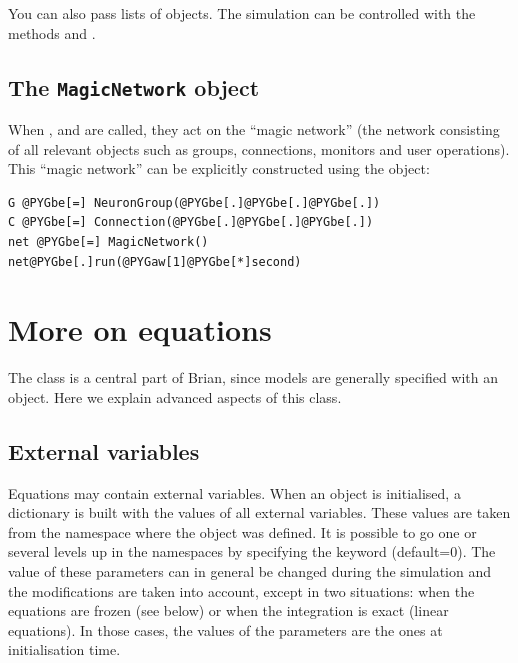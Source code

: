 \documentclass[letterpaper,10pt,english]{manual}
\begin{document}
You can also pass lists of objects. The simulation can be controlled with the methods
 and .


\subsection{The \texttt{MagicNetwork} object}

When \hyperlink{brian.run}{}, \hyperlink{brian.reinit}{} and \hyperlink{brian.stop}{} are called, they act on the ``magic network'' (the network
consisting of all relevant objects such as groups, connections, monitors and user operations). This ``magic
network'' can be explicitly constructed using the \hyperlink{brian.MagicNetwork}{} object:

\begin{Verbatim}[commandchars=@\[\]]
G @PYGbe[=] NeuronGroup(@PYGbe[.]@PYGbe[.]@PYGbe[.])
C @PYGbe[=] Connection(@PYGbe[.]@PYGbe[.]@PYGbe[.])
net @PYGbe[=] MagicNetwork()
net@PYGbe[.]run(@PYGaw[1]@PYGbe[*]second)
\end{Verbatim}

\resetcurrentobjects
{}

\hypertarget{moreonequations}{}\section{More on equations}

The \hyperlink{brian.Equations}{} class is a central part of Brian, since
models are generally specified with an \hyperlink{brian.Equations}{} object.
Here we explain advanced aspects of this class.

\hypertarget{index-6}{}\subsection{External variables}

Equations may contain external variables. When an \hyperlink{brian.Equations}{} object is initialised,
a dictionary is built with the values of all external variables. These values are taken
from the namespace where the \hyperlink{brian.Equations}{} object was defined. It is possible to go one or
several levels up in the namespaces by specifying the keyword  (default=0).
The value of these parameters can in general be changed during the simulation and the
modifications are taken into account, except in two situations: when the equations are
frozen (see below) or when the integration is exact (linear equations). In those cases,
the values of the parameters are the ones at initialisation time.
\end{document}
